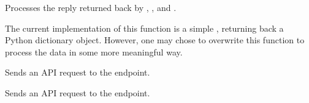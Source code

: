 \documentclass[letterpaper,10pt,english,openany,oneside]{sphinxmanual}
\begin{document}
\begin{fulllineitems}
\begin{fulllineitems}
\end{fulllineitems}


\begin{fulllineitems}
\label{\detokenize{source/http:instahashtag.http.Base.process}}
Processes the reply returned back by {\hyperref[\detokenize{source/http:instahashtag.http.Base.tag}]{}}, {\hyperref[\detokenize{source/http:instahashtag.http.Base.graph}]{}}, and {\hyperref[\detokenize{source/http:instahashtag.http.Base.maps}]{}}.

The current implementation of this function is a simple , returning
back a Python dictionary object. However, one may chose to overwrite this function to
process the data in some more meaningful way.

\end{fulllineitems}


\begin{fulllineitems}
\label{\detokenize{source/http:instahashtag.http.Base.tag}}
Sends an API request to the  endpoint.

\end{fulllineitems}


\begin{fulllineitems}
\label{\detokenize{source/http:instahashtag.http.Base.graph}}
Sends an API request to the  endpoint.

\end{fulllineitems}


\end{fulllineitems}
\end{document}
